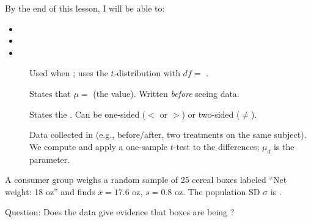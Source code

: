 \documentclass[10pt]{article}
\begin{document}
\namedateperiod

\vspace{0.15in}

\begin{objectivebox}
By the end of this lesson, I will be able to:
\begin{itemize}
  \item {}
  \item {}
  \item {}
\end{itemize}
\end{objectivebox}

\begin{vocabbox}
\begin{description}
  \item[]
        Used when ; uses the $t$-distribution with $df = $ .
  \item[]
        States that $\mu = $  (the  value). Written \emph{before} seeing data.
  \item[]
        States the . Can be one-sided ($<$ or $>$) or two-sided ($\ne$).
  \item[]
        Data collected in  (e.g., before/after, two treatments on the same subject).
        We compute  and apply a one-sample $t$-test to the differences; $\mu_d$ is
        the parameter.
\end{description}
\end{vocabbox}

\begin{hookbox}
A consumer group weighs a random sample of 25 cereal boxes labeled ``Net weight: 18 oz'' and
finds $\bar x = 17.6$ oz, $s = 0.8$ oz. The population SD $\sigma$ is .

Question: Does the data give evidence that boxes are being ?
\end{hookbox}
\end{document}
